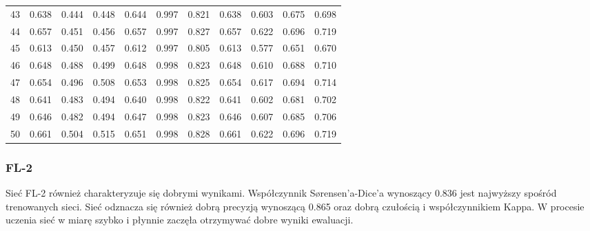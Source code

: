\begin{longtable}[p]{|c|c|c|c|c|c|c|c|c|c|c|}
	43 & 0.638 & 0.444 & 0.448 & 0.644 & 0.997 & 0.821 & 0.638 & 0.603 & 0.675 & 0.698 \\
	44 & 0.657 & 0.451 & 0.456 & 0.657 & 0.997 & 0.827 & 0.657 & 0.622 & 0.696 & 0.719 \\
	45 & 0.613 & 0.450 & 0.457 & 0.612 & 0.997 & 0.805 & 0.613 & 0.577 & 0.651 & 0.670 \\
	46 & 0.648 & 0.488 & 0.499 & 0.648 & 0.998 & 0.823 & 0.648 & 0.610 & 0.688 & 0.710 \\
	47 & 0.654 & 0.496 & 0.508 & 0.653 & 0.998 & 0.825 & 0.654 & 0.617 & 0.694 & 0.714 \\
	48 & 0.641 & 0.483 & 0.494 & 0.640 & 0.998 & 0.822 & 0.641 & 0.602 & 0.681 & 0.702 \\
	49 & 0.646 & 0.482 & 0.494 & 0.647 & 0.998 & 0.823 & 0.646 & 0.607 & 0.685 & 0.706 \\
	50 & 0.661 & 0.504 & 0.515 & 0.651 & 0.998 & 0.828 & 0.661 & 0.622 & 0.696 & 0.719
	\label{tab:metrics-bce-400}
\end{longtable}


\subsubsection{FL-2}
Sieć FL-2 również charakteryzuje się dobrymi wynikami. Współczynnik Sørensen'a-Dice'a wynoszący 0.836 jest najwyższy spośród trenowanych sieci. Sieć odznacza się również dobrą precyzją wynoszącą 0.865 oraz dobrą czułością i współczynnikiem Kappa. W procesie uczenia sieć w miarę szybko i płynnie zaczęła otrzymywać dobre wyniki ewaluacji. 






